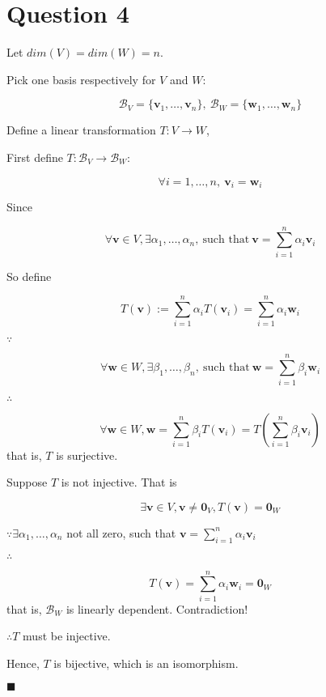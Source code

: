 \documentclass[12pt]{article}
\renewcommand{\qed}{\hfill$\blacksquare$}
\renewenvironment{proof}{\begin{addmargin}[1em]{0em}\begin{newproof}}{\end{newproof}\end{addmargin}\qed}
\begin{document}
\pagebreak

\section{Question 4}

\begin{proof}{}
    \noindent

    Let $dim(V)=dim(W)=n$.

    Pick one basis respectively for $V$ and $W$:

    \[
        \mathcal{B}_V=\{\mathbf{v}_1,\dots,\mathbf{v}_n\},\ \mathcal{B}_W=\{\mathbf{w}_1,\dots,\mathbf{w}_n\}
    \]

    Define a linear transformation $T:V\rightarrow W$,

    First define $T:\mathcal{B}_V\rightarrow\mathcal{B}_W$:

    \begin{equation}
        \forall i=1,\dots,n,\ \mathbf{v}_i=\mathbf{w}_i
    \end{equation}

    Since

    \[
        \forall\mathbf{v}\in V,\exists\alpha_1,\dots,\alpha_n,\ \textrm{such that}\ \mathbf{v}=\sum_{i=1}^{n}\alpha_i\mathbf{v}_i
    \]

    So define

    \[
        T(\mathbf{v}):=\sum_{i=1}^{n}\alpha_iT(\mathbf{v}_i)=\sum_{i=1}^{n}\alpha_i\mathbf{w}_i
    \]

    $\because$

    \[
        \forall\mathbf{w}\in W,\exists\beta_1,\dots,\beta_n,\ \textrm{such that}\ \mathbf{w}=\sum_{i=1}^{n}\beta_i\mathbf{w}_i
    \]

    $\therefore$

    \[
        \forall\mathbf{w}\in W,\mathbf{w}=\sum_{i=1}^{n}\beta_iT(\mathbf{v}_i)=T(\sum_{i=1}^{n}\beta_i\mathbf{v}_i)
    \]that is, $T$ is surjective.

    Suppose $T$ is not injective. That is

    \[
        \exists\mathbf{v}\in V,\mathbf{v}\not=\mathbf{0}_V,T(\mathbf{v})=\mathbf{0}_W
    \]

    $\because\exists\alpha_1,\dots,\alpha_n$ not all zero, such that $\mathbf{v}=\sum_{i=1}^{n}\alpha_i\mathbf{v}_i$

    $\therefore$

    \[
        T(\mathbf{v})=\sum_{i=1}^{n}\alpha_i\mathbf{w}_i=\mathbf{0}_W
    \]that is, $\mathcal{B}_W$ is linearly dependent. Contradiction!

    $\therefore T$ must be injective.

    Hence, $T$ is bijective, which is an isomorphism.
\end{proof}
\end{document}
